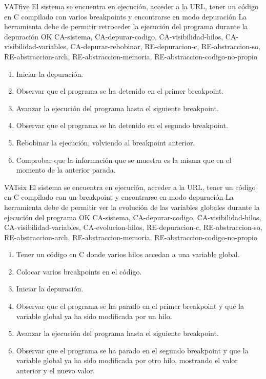 \begin{testCase}{VAT}{five}
    {El sistema se encuentra en ejecución, acceder a la URL, tener un código en C compilado con varios breakpoints y encontrarse en modo depuración}
    {\NA}
    {La herramienta debe de permitir retroceder la ejecución del programa durante la depuración}
    {OK}
    {CA-sistema, CA-depurar-codigo, CA-visibilidad-hilos, CA-visibilidad-variables, CA-depurar-rebobinar, RE-depuracion-c, RE-abstraccion-so, RE-abstraccion-arch, RE-abstraccion-memoria, RE-abstraccion-codigo-no-propio}
    \begin{enumerate}
        \item Iniciar la depuración.
        \item Observar que el programa se ha detenido en el primer breakpoint.
        \item Avanzar la ejecución del programa hasta el siguiente breakpoint.
        \item Observar que el programa se ha detenido en el segundo breakpoint.
        \item Rebobinar la ejecución, volviendo al breakpoint anterior.
        \item Comprobar que la información que se muestra es la misma que en el momento de la anterior parada.
    \end{enumerate}
\end{testCase}

\begin{testCase}{VAT}{six}
    {El sistema se encuentra en ejecución, acceder a la URL, tener un código en C compilado con un breakpoint y encontrarse en modo depuración}
    {\NA}
    {La herramienta debe de permitir ver la evolución de las variables globales durante la ejecución del programa}
    {OK}
    {CA-sistema, CA-depurar-codigo, CA-visibilidad-hilos, CA-visibilidad-variables, CA-evolucion-hilos, RE-depuracion-c, RE-abstraccion-so, RE-abstraccion-arch, RE-abstraccion-memoria, RE-abstraccion-codigo-no-propio}
    \begin{enumerate}
        \item Tener un código en C donde varios hilos accedan a una variable global.
        \item Colocar varios breakpoints en el código.
        \item Iniciar la depuración.
        \item Observar que el programa se ha parado en el primer breakpoint y que la variable global ya ha sido modificada por un hilo.
        \item Avanzar la ejecución del programa hasta el siguiente breakpoint.
        \item Observar que el programa se ha parado en el segundo breakpoint y que la variable global ya ha sido modificada por otro hilo, mostrando el valor anterior y el nuevo valor.
    \end{enumerate}
\end{testCase}

